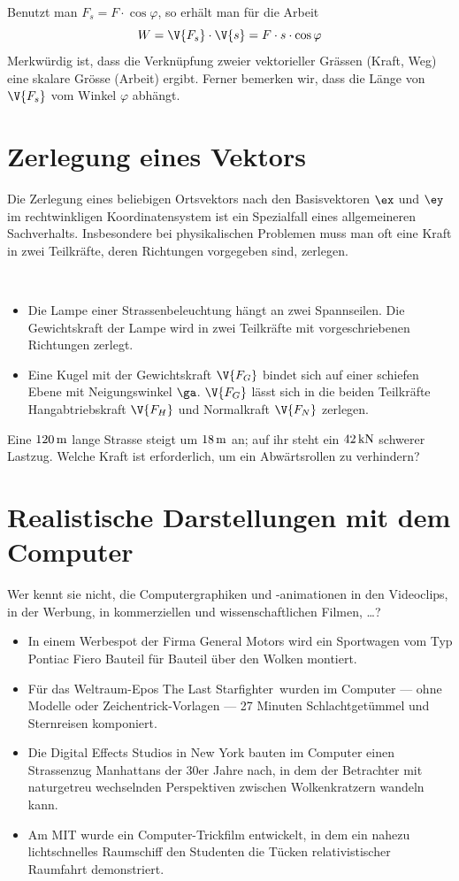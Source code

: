 \documentclass[%
11pt,%
twoside,%
titlepage,%
german,%
headsepline%
]{scrartcl}
\begin{document}
Benutzt man $F_s = F\cdot\cos\varphi$, so erhält man für die Arbeit
$$W = \V{F_s}\cdot\V{s} = F\cdot s \cdot \cos \varphi$$
Merkwürdig ist, dass die Verknüpfung zweier vektorieller Grässen (Kraft, Weg) eine skalare Grösse (Arbeit) ergibt. Ferner bemerken wir, dass die Länge von $\V{F_s}$ vom Winkel $\varphi$ abhängt.

\section{Zerlegung eines Vektors}
Die Zerlegung eines beliebigen Ortsvektors nach den Basisvektoren $\ex$ und $\ey$ im rechtwinkligen Koordinatensystem ist ein Spezialfall eines allgemeineren Sachverhalts. Insbesondere bei physikalischen Problemen muss man oft eine Kraft in zwei Teilkräfte, deren Richtungen vorgegeben sind, zerlegen.

\begin{bsps}
\ \\[-4ex]
\begin{itemize}
\item Die Lampe einer Strassenbeleuchtung hängt an zwei Spannseilen. Die Gewichtskraft der Lampe wird in zwei Teilkräfte mit vorgeschriebenen Richtungen zerlegt.
\item Eine Kugel mit der Gewichtskraft $\V{F_G}$ bindet sich auf einer schiefen Ebene mit Neigungswinkel $\ga$. $\V{F_G}$ lässt sich in die beiden Teilkräfte Hangabtriebskraft $\V{F_H}$ und Normalkraft $\V{F_N}$ zerlegen.
\end{itemize}
\end{bsps}

\begin{ueb}
Eine $\unit[120]{m}$ lange Strasse steigt um $\unit[18]{m}$ an; auf ihr steht ein $\unit[42]{kN}$ schwerer Lastzug. Welche Kraft ist erforderlich, um ein Abwärtsrollen zu verhindern?
\end{ueb}
\section{Realistische Darstellungen mit dem Computer}
Wer kennt sie nicht, die Computergraphiken und -animationen in den Videoclips, in der Werbung, in kommerziellen und wissenschaftlichen Filmen, \dots?

\begin{itemize}
\item In einem Werbespot der Firma General Motors wird ein Sportwagen vom Typ Pontiac Fiero Bauteil für Bauteil über den Wolken montiert.
\item Für das Weltraum-Epos \glqq The Last Starfighter\grqq\ wurden im Computer --- ohne Modelle oder Zeichentrick-Vorlagen --- 27 Minuten Schlachtgetümmel und Sternreisen komponiert.
\item Die Digital Effects Studios in New York bauten im Computer einen Strassenzug Manhattans der 30er Jahre nach, in dem der Betrachter mit naturgetreu wechselnden Perspektiven zwischen Wolkenkratzern wandeln kann.
\item Am MIT wurde ein Computer-Trickfilm entwickelt, in dem ein nahezu lichtschnelles Raumschiff den Studenten die Tücken relativistischer Raumfahrt demonstriert.
\end{itemize}
\end{document}
